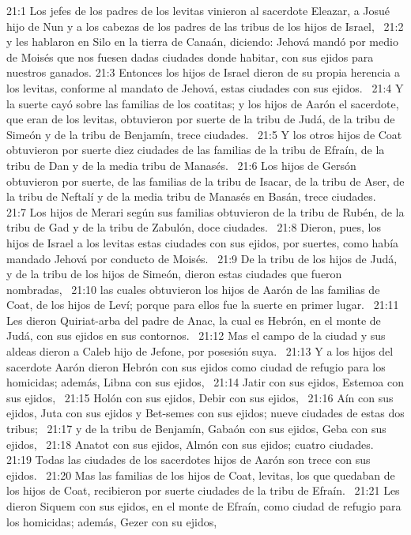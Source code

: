 21:1 Los jefes de los padres de los levitas vinieron al sacerdote Eleazar, a Josué hijo de Nun y a los cabezas de los padres de las tribus de los hijos de Israel,  
21:2 y les hablaron en Silo en la tierra de Canaán, diciendo: Jehová mandó por medio de Moisés que nos fuesen dadas ciudades donde habitar, con sus ejidos para nuestros ganados. 
21:3 Entonces los hijos de Israel dieron de su propia herencia a los levitas, conforme al mandato de Jehová, estas ciudades con sus ejidos.  
21:4 Y la suerte cayó sobre las familias de los coatitas; y los hijos de Aarón el sacerdote, que eran de los levitas, obtuvieron por suerte de la tribu de Judá, de la tribu de Simeón y de la tribu de Benjamín, trece ciudades.  
21:5 Y los otros hijos de Coat obtuvieron por suerte diez ciudades de las familias de la tribu de Efraín, de la tribu de Dan y de la media tribu de Manasés.  
21:6 Los hijos de Gersón obtuvieron por suerte, de las familias de la tribu de Isacar, de la tribu de Aser, de la tribu de Neftalí y de la media tribu de Manasés en Basán, trece ciudades.  
21:7 Los hijos de Merari según sus familias obtuvieron de la tribu de Rubén, de la tribu de Gad y de la tribu de Zabulón, doce ciudades.  
21:8 Dieron, pues, los hijos de Israel a los levitas estas ciudades con sus ejidos, por suertes, como había mandado Jehová por conducto de Moisés.  
21:9 De la tribu de los hijos de Judá, y de la tribu de los hijos de Simeón, dieron estas ciudades que fueron nombradas,  
21:10 las cuales obtuvieron los hijos de Aarón de las familias de Coat, de los hijos de Leví; porque para ellos fue la suerte en primer lugar.  
21:11 Les dieron Quiriat-arba del padre de Anac, la cual es Hebrón, en el monte de Judá, con sus ejidos en sus contornos.  
21:12 Mas el campo de la ciudad y sus aldeas dieron a Caleb hijo de Jefone, por posesión suya.  
21:13 Y a los hijos del sacerdote Aarón dieron Hebrón con sus ejidos como ciudad de refugio para los homicidas; además, Libna con sus ejidos,  
21:14 Jatir con sus ejidos, Estemoa con sus ejidos,  
21:15 Holón con sus ejidos, Debir con sus ejidos,  
21:16 Aín con sus ejidos, Juta con sus ejidos y Bet-semes con sus ejidos; nueve ciudades de estas dos tribus;  
21:17 y de la tribu de Benjamín, Gabaón con sus ejidos, Geba con sus ejidos,  
21:18 Anatot con sus ejidos, Almón con sus ejidos; cuatro ciudades.  
21:19 Todas las ciudades de los sacerdotes hijos de Aarón son trece con sus ejidos.  
21:20 Mas las familias de los hijos de Coat, levitas, los que quedaban de los hijos de Coat, recibieron por suerte ciudades de la tribu de Efraín.  
21:21 Les dieron Siquem con sus ejidos, en el monte de Efraín, como ciudad de refugio para los homicidas; además, Gezer con su ejidos,  
